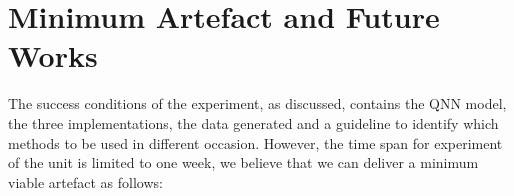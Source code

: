 \section{Minimum Artefact and Future Works}

The success conditions of the experiment, as discussed, contains the QNN model, the three implementations, the data generated and a guideline to identify which methods to be used in different occasion.
However, the time span for experiment of the unit is limited to one week, we believe that we can deliver a minimum viable artefact as follows: